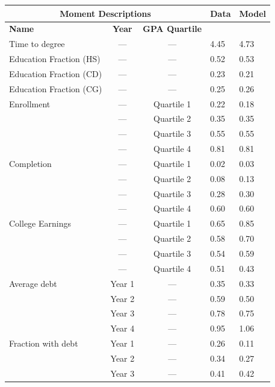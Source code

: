   \begin{table}[H]
    \begin{tabular}{lccll}
      \toprule
      \multicolumn{3}{c}{\textbf{Moment Descriptions}} & \textbf{Data} & \textbf{Model} \\
      \midrule
      \textbf{Name} & \textbf{Year} & \textbf{GPA Quartile} & & \\
      \midrule
      Time to degree & --- & --- & 4.45 & 4.73 \\
      Education Fraction (HS) & --- & --- & 0.52 & 0.53 \\
      Education Fraction (CD) & --- & --- & 0.23 & 0.21 \\
      Education Fraction (CG) & --- & --- & 0.25 & 0.26 \\
      \midrule
      Enrollment & --- & Quartile 1 & 0.22 & 0.18 \\
                 & --- & Quartile 2 & 0.35 & 0.35 \\
                 & --- & Quartile 3 & 0.55 & 0.55 \\
                 & --- & Quartile 4 & 0.81 & 0.81 \\
      \midrule
      Completion & --- & Quartile 1 & 0.02 & 0.03 \\
                 & --- & Quartile 2 & 0.08 & 0.13 \\
                 & --- & Quartile 3 & 0.28 & 0.30 \\
                 & --- & Quartile 4 & 0.60 & 0.60 \\
      \midrule
      College Earnings & --- & Quartile 1 & 0.65 & 0.85 \\
                       & --- & Quartile 2 & 0.58 & 0.70 \\
                       & --- & Quartile 3 & 0.54 & 0.59 \\
                       & --- & Quartile 4 & 0.51 & 0.43 \\
      \midrule
      Average debt & Year 1 & --- & 0.35 & 0.33 \\
                   & Year 2 & --- & 0.59 & 0.50 \\
                   & Year 3 & --- & 0.78 & 0.75 \\
                   & Year 4 & --- & 0.95 & 1.06 \\
      \midrule
      Fraction with debt & Year 1 & --- & 0.26 & 0.11 \\
                         & Year 2 & --- & 0.34 & 0.27 \\
                         & Year 3 & --- & 0.41 & 0.42 \\

\end{tabular}
\end{table}
